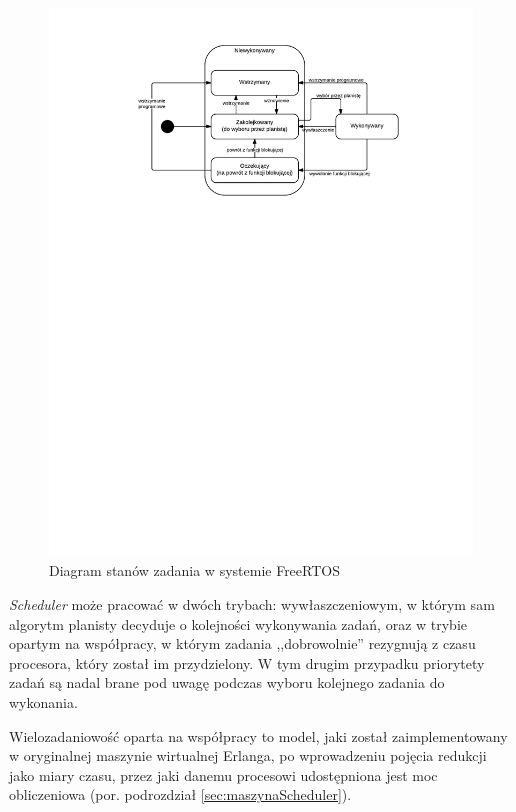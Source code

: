\begin{figure}[h]
\centerline{\includegraphics[scale=1, clip, trim=0 180mm 0 15mm]{freertos_task_state}}
\caption{Diagram stanów zadania w systemie FreeRTOS}
\label{fig:taskstate}
\end{figure}


\emph{Scheduler} może pracować w dwóch trybach: wywłaszczeniowym, w którym sam algorytm planisty decyduje o kolejności wykonywania zadań, oraz w trybie opartym na współpracy, w którym zadania ,,dobrowolnie'' rezygnują z czasu procesora, który został im przydzielony. W tym drugim przypadku priorytety zadań są nadal brane pod uwagę podczas wyboru kolejnego zadania do wykonania.

Wielozadaniowość oparta na współpracy to model, jaki został zaimplementowany w oryginalnej maszynie wirtualnej Erlanga, po wprowadzeniu pojęcia redukcji jako miary czasu, przez jaki danemu procesowi udostępniona jest moc obliczeniowa (por. podrozdział \ref{sec:maszynaScheduler}).

